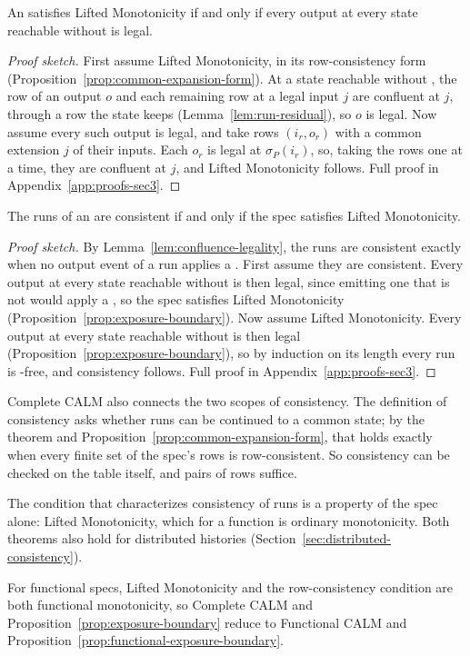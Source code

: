 \begin{proposition}
\label{prop:exposure-boundary}
An \spectype satisfies Lifted Monotonicity if and only
if every output at every state reachable without \commitment is legal.
\end{proposition}

\begin{proof}[Proof sketch]
First assume Lifted Monotonicity, in its row-consistency form
(Proposition~\ref{prop:common-expansion-form}).  At a state reachable without
\commitment, the row of an output $o$ and each remaining row at a legal input $j$ are confluent at $j$, through a row the state keeps
(Lemma~\ref{lem:run-residual}), so $o$ is legal.  Now assume every such output
is legal, and take rows $(i_r,o_r)$ with a common extension $j$ of their inputs.  Each $o_r$ is legal at $\sigma_P(i_r)$, so, taking the rows one at a time, they are confluent at $j$, and Lifted Monotonicity follows.  Full proof in
Appendix~\ref{app:proofs-sec3}.
\end{proof}

\begin{theorem}
\label{thm:complete-calm}
The runs of an \spectype are consistent if and only if the spec satisfies
Lifted Monotonicity.
\end{theorem}

\begin{proof}[Proof sketch]
By Lemma~\ref{lem:confluence-legality}, the runs are consistent exactly when
no output event of a run applies a \commitment.  First assume they are
consistent.  Every output at every state reachable without \commitment is then
legal, since emitting one that is not would apply a \commitment, so the spec
satisfies Lifted Monotonicity (Proposition~\ref{prop:exposure-boundary}).  Now
assume Lifted Monotonicity.  Every output at every state reachable without
\commitment is then legal (Proposition~\ref{prop:exposure-boundary}), so by
induction on its length every run is \commitment-free, and consistency
follows.  Full proof in Appendix~\ref{app:proofs-sec3}.
\end{proof}

Complete CALM also connects the two scopes of consistency.  The definition of
consistency asks whether runs can be continued to a common state; by the
theorem and Proposition~\ref{prop:common-expansion-form}, that holds exactly
when every finite set of the spec's rows is row-consistent.  So consistency can
be checked on the table itself, and pairs of rows suffice.

The condition that characterizes consistency of runs is a property of the spec
alone: Lifted Monotonicity, which for a function is ordinary monotonicity.
Both theorems also hold for distributed histories
(Section~\ref{sec:distributed-consistency}).

For functional specs, Lifted Monotonicity and the row-consistency condition
are both functional monotonicity, so Complete CALM and
Proposition~\ref{prop:exposure-boundary} reduce to Functional CALM and
Proposition~\ref{prop:functional-exposure-boundary}.
